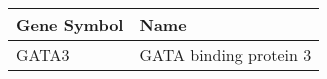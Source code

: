 \begin{tabular}{ll}
\toprule
Gene Symbol &                   Name \\
\midrule
      GATA3 & GATA binding protein 3 \\
\bottomrule
\end{tabular}
